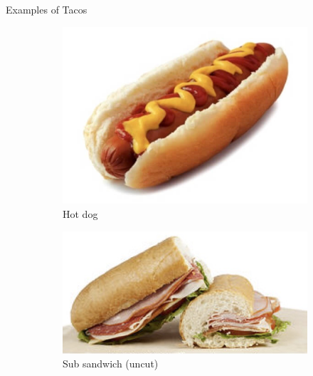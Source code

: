 \documentclass{beamer}
\begin{document}
\begin{frame}{Examples of Tacos}
    \begin{figure}
        \begin{subfigure}{.4\textwidth}
          \centering
          \includegraphics[width=.8\linewidth]{images/cube_rule_of_food/taco/20_hotdog.jpg}
          \caption{\label{fig:hot-dog-taco}Hot dog}
        \end{subfigure}%
        \begin{subfigure}{.4\textwidth}
          \centering
          \includegraphics[width=.8\linewidth]{images/cube_rule_of_food/taco/20_sub.jpg}
          \caption{\label{fig:sub}Sub sandwich (uncut)}
        \end{subfigure}
        \begin{subfigure}{.5\textwidth}

\end{subfigure}
\end{figure}
\end{frame}
\end{document}
